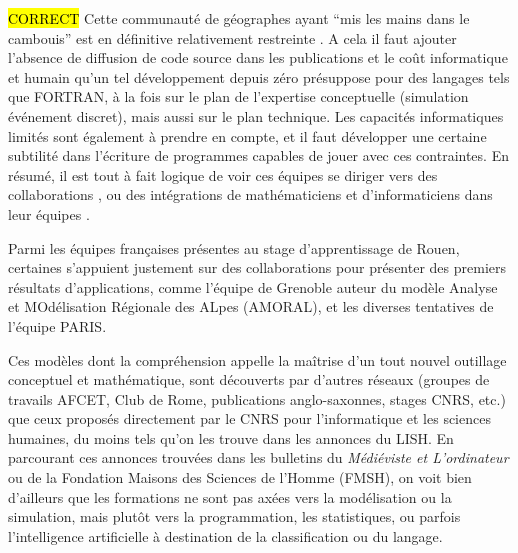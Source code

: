 \hl{CORRECT}
Cette communauté de géographes ayant \enquote{mis les mains dans le cambouis} est en définitive relativement restreinte . A cela il faut ajouter l'absence de diffusion de code source dans les publications et le coût informatique et humain qu'un tel développement depuis zéro présuppose pour des langages tels que FORTRAN, à la fois sur le plan de l'expertise conceptuelle (simulation événement discret), mais aussi sur le plan technique. Les capacités informatiques limités sont également à prendre en compte, et il faut développer une certaine subtilité dans l'écriture de programmes capables de jouer avec ces contraintes. En résumé, il est tout à fait logique de voir ces équipes se diriger vers des collaborations , ou des intégrations de mathématiciens et d'informaticiens dans leur équipes \autocite{Pumain2014}. %

Parmi les équipes françaises présentes au stage d'apprentissage de Rouen, certaines s'appuient justement sur des collaborations pour présenter des premiers résultats d'applications, comme l’équipe de Grenoble auteur du modèle Analyse et MOdélisation Régionale des ALpes (AMORAL), et les diverses tentatives de l’équipe PARIS.  %

Ces modèles dont la compréhension appelle la maîtrise d'un tout nouvel outillage conceptuel et mathématique, sont découverts par d'autres réseaux (groupes de travails AFCET, Club de Rome, publications anglo-saxonnes, stages CNRS, etc.) que ceux proposés directement par le CNRS pour l'informatique et les sciences humaines, du moins tels qu'on les trouve dans les annonces du LISH. En parcourant ces annonces trouvées dans les bulletins du \textit{Médiéviste et L'ordinateur} ou de la Fondation Maisons des Sciences de l'Homme (FMSH), on voit bien d'ailleurs que les formations ne sont pas axées vers la modélisation ou la simulation, mais plutôt vers la programmation, les statistiques, ou parfois l'intelligence artificielle à destination de la classification ou du langage.

